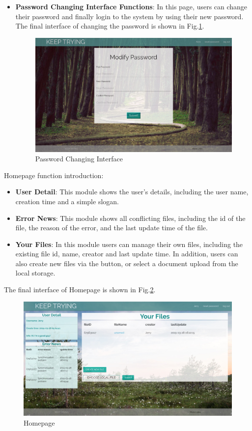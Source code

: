 \begin{itemize}
     \item \textbf{Password Changing Interface Functions}: In this page, users can change their password and finally login to the system by using their new password. The final interface of changing the password is shown in Fig.\ref{change}.
      
      \begin{figure}[H]
     \centering
     \includegraphics[width=.8\textwidth]{changepasswdui.jpeg}
     \caption{Password Changing Interface}
     \label{change}
     \end{figure}
     
    
\end{itemize}


\noindent Homepage function introduction:
\begin{itemize}
     \item \textbf{User Detail}: This module shows the user's details, including the user name, creation time and a simple slogan.
     \item \textbf{Error News}: This module shows all conflicting files, including the id of the file, the reason of the error, and the last update time of the file.
     \item \textbf{Your Files}: In this module users can manage their own files, including the existing file id, name, creator and last update time. In addition, users can also create new files via the  button, or select a document upload from the local storage.

\end{itemize}



\noindent The final interface of Homepage is shown in Fig.\ref{home}.
    \begin{figure}[H]
     \centering
     \includegraphics[width=.8\textwidth]{homep.jpeg}
     \caption{Homepage}
     \label{home}
     \end{figure}
    



